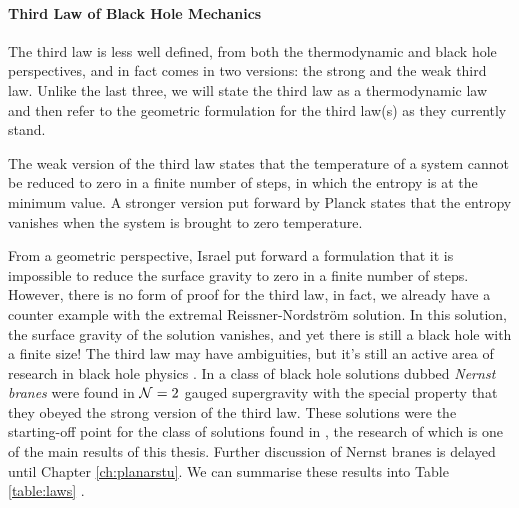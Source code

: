 \paragraph{Third Law of Black Hole Mechanics}

The third law is less well defined, from both the thermodynamic and black hole perspectives, and in fact comes in two versions: the strong and the weak third law. Unlike the last three, we will state the third law as a thermodynamic law and then refer to the geometric formulation for the third law(s) as they currently stand.

The weak version of the third law states that the temperature of a system cannot be reduced to zero in a finite number of steps, in which the entropy is at the minimum value. A stronger version put forward by Planck \cite{landau2013statistical} states that the entropy vanishes when the system is brought to zero temperature.

From a geometric perspective, Israel put forward a formulation \cite{Israelthird} that it is impossible to reduce the surface gravity to zero in a finite number of steps. However, there is no form of proof for the third law, in fact, we already have a counter example with the extremal Reissner-Nordstr\"om solution. In this solution, the surface gravity of the solution vanishes, and yet there is still a black hole with a finite size! The third law may have ambiguities, but it's still an active area of research in black hole physics \cite{ Page:1976ki, Wald:1997qp, Hartnoll:2007ih, DHoker:2009ixq}. In \cite{Barisch:2011ui, Cardoso:2015wcf, Dempster:2015, Dempster:2016} a class of black hole solutions dubbed \emph{Nernst branes} were found in ${\cal N} = 2$ gauged supergravity with the special property that they obeyed the strong version of the third law. These solutions were the starting-off point for the class of solutions found in \cite{Gutowski:2019iyo}, the research of which is one of the main results of this thesis. Further discussion of Nernst branes is delayed until Chapter \ref{ch:planarstu}. We can summarise these results into Table \ref{table:laws} \cite{Wald:106274}.

